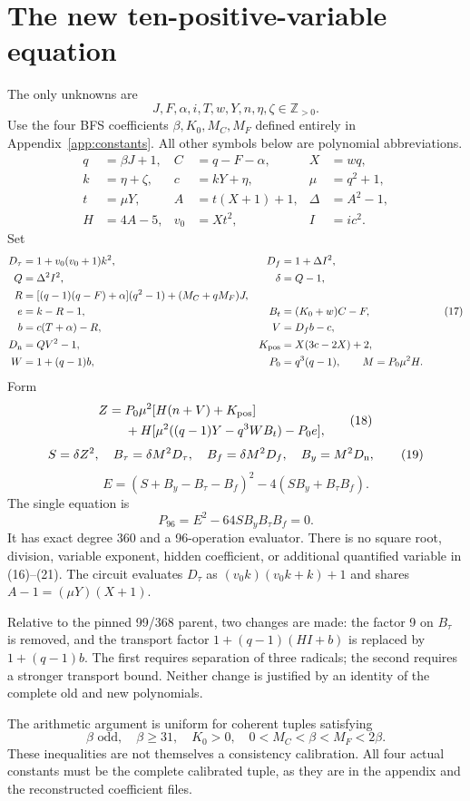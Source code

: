 \documentclass[11pt]{article}
\theoremstyle{remark}
\newcommand{\Pos}{\mathbb Z_{>0}}
\begin{document}
\section{The new ten-positive-variable equation}
\label{sec:positive}

The only unknowns are
\[
J,F,\alpha,i,T,w,Y,n,\eta,\zeta\in\Pos.
\tag{15}
\]
Use the four BFS coefficients $\beta,K_0,M_C,M_F$ defined entirely in
Appendix~\ref{app:constants}. All other symbols below are polynomial
abbreviations.
\[
\begin{aligned}
q&=\beta J+1,&C&=q-F-\alpha,&X&=wq,\\
k&=\eta+\zeta,&c&=kY+\eta,&\mu&=q^2+1,\\
t&=\mu Y,&A&=t(X+1)+1,&\Delta&=A^2-1,\\
H&=4A-5,&v_0&=Xt^2,&I&=ic^2.
\end{aligned}
\tag{16}
\]
Set
\[
\begin{aligned}
D_\tau&=1+v_0(v_0+1)k^2,&D_f&=1+\Delta I^2,\\
Q&=\Delta^2I^2,&\delta&=Q-1,\\
R&=[(q-1)(q-F)+\alpha](q^2-1)+(M_C+qM_F)J,\\
e&=k-R-1,&B_t&=(K_0+w)C-F,\\
b&=c(T+\alpha)-R,&V&=D_fb-c,\\
D_{\rm n}&=QV^2-1,&K_{\rm pos}&=X(3c-2X)+2,\\
W&=1+(q-1)b,&P_0&=q^3(q-1),\qquad M=P_0\mu^2H.
\end{aligned}
\tag{17}
\]
Form
\[
\begin{split}
Z={}&P_0\mu^2[H(n+V)+K_{\rm pos}]\\
&+H[\mu^2((q-1)Y-q^3WB_t)-P_0e],
\end{split}
\tag{18}
\]
\[
S=\delta Z^2,\quad B_\tau=\delta M^2D_\tau,\quad
B_f=\delta M^2D_f,\quad B_y=M^2D_{\rm n},
\tag{19}
\]
\[
E=(S+B_y-B_\tau-B_f)^2-4(SB_y+B_\tau B_f).
\tag{20}
\]
The single equation is
\[
\boxed{\qquad P_{96}=E^2-64SB_yB_\tau B_f=0.\qquad}
\tag{21}
\]
It has exact degree 360 and a 96-operation evaluator.
There is no square root, division, variable exponent, hidden coefficient,
or additional quantified variable in (16)--(21).
The circuit evaluates $D_\tau$ as $(v_0k)(v_0k+k)+1$ and shares
$A-1=(\mu Y)(X+1)$.

Relative to the pinned 99/368 parent, two changes are made:
the factor 9 on $B_\tau$ is removed, and the transport factor
$1+(q-1)(HI+b)$ is replaced by $1+(q-1)b$.
The first requires separation of three radicals; the second requires a
stronger transport bound. Neither change is justified by an identity of
the complete old and new polynomials.

The arithmetic argument is uniform for coherent tuples satisfying
\[
\beta\text{ odd},\quad\beta\ge31,\quad K_0>0,\quad
0<M_C<\beta<M_F<2\beta.
\tag{22}
\]
These inequalities are not themselves a consistency calibration.
All four actual constants must be the complete calibrated tuple, as they
are in the appendix and the reconstructed coefficient files.



\end{document}
